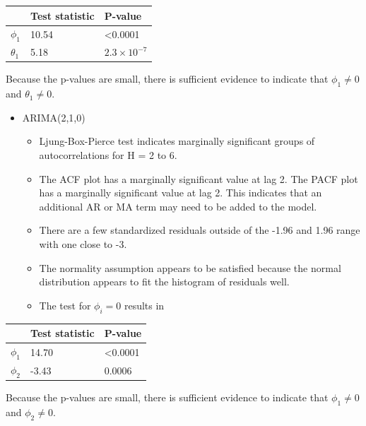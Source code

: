 \documentclass[
]{book}
\providecommand{\tightlist}{%
  \setlength{\itemsep}{0pt}\setlength{\parskip}{0pt}}
\theoremstyle{definition}
\theoremstyle{definition}
\theoremstyle{definition}
\theoremstyle{definition}
\theoremstyle{remark}
\begin{document}
\begin{longtable}[]{@{}lll@{}}
\toprule()
& Test statistic & P-value \\
\midrule()
\endhead
\(\phi_1\) & 10.54 & \textless0.0001 \\
\(\theta_1\) & 5.18 & \(2.3\times 10^{-7}\) \\
\bottomrule()
\end{longtable}

Because the p-values are small, there is sufficient evidence to indicate that \(\phi_1\ne 0\) and \(\theta_1\ne 0\).

\begin{itemize}
\tightlist
\item
  ARIMA(2,1,0)

  \begin{itemize}
  \tightlist
  \item
    Ljung-Box-Pierce test indicates marginally significant groups of autocorrelations for H = 2 to 6.
  \item
    The ACF plot has a marginally significant value at lag 2. The PACF plot has a marginally significant value at lag 2. This indicates that an additional AR or MA term may need to be added to the model.
  \item
    There are a few standardized residuals outside of the -1.96 and 1.96 range with one close to -3.\\
  \item
    The normality assumption appears to be satisfied because the normal distribution appears to fit the histogram of residuals well.\\
  \item
    The test for \(\phi_i = 0\) results in
  \end{itemize}
\end{itemize}

\begin{longtable}[]{@{}lll@{}}
\toprule()
& Test statistic & P-value \\
\midrule()
\endhead
\(\phi_1\) & 14.70 & \textless0.0001 \\
\(\phi_2\) & -3.43 & 0.0006 \\
\bottomrule()
\end{longtable}

Because the p-values are small, there is sufficient evidence to indicate that \(\phi_1 \ne 0\) and \(\phi_2 \ne 0\).
\end{document}
